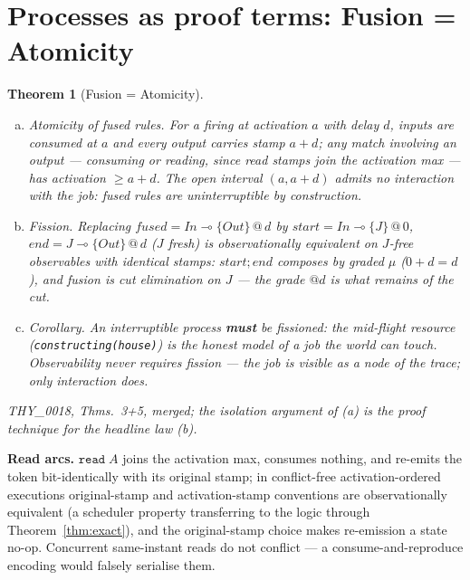 \documentclass[11pt]{article}
\makeatletter
\newcommand{\lax}[2]{\{#1\}\mathbin{@}#2}       %
\newcommand{\loli}{\multimap}                    %
\newtheorem{theorem}{Theorem}[section]
\theoremstyle{definition}
\theoremstyle{remark}
\makeatother
\begin{document}
\section{Processes as proof terms: Fusion = Atomicity}
\label{sec:processes}

\begin{theorem}[Fusion = Atomicity]
\label{thm:fusion}
\begin{enumerate}[(a)]
\item \emph{Atomicity of fused rules.}  For a firing at activation $a$ with
  delay $d$, inputs are consumed at $a$ and every output carries stamp $a+d$;
  any match involving an output --- consuming \emph{or reading}, since read
  stamps join the activation max --- has activation $\geq a+d$.  The open
  interval $(a, a{+}d)$ admits no interaction with the job: fused rules are
  uninterruptible by construction.
\item \emph{Fission.}  Replacing
  $\mathit{fused} = \mathit{In} \loli \lax{\mathit{Out}}{d}$ by
  $\mathit{start} = \mathit{In} \loli \lax{J}{0}$,
  $\mathit{end} = J \loli \lax{\mathit{Out}}{d}$
  ($J$ fresh) is observationally equivalent on $J$-free observables with
  identical stamps: $\mathit{start};\mathit{end}$ composes by graded $\mu$
  ($0+d = d$), and fusion is cut elimination on $J$ --- the grade $@d$ is what
  remains of the cut.
\item \emph{Corollary.}  An interruptible process \textbf{must} be fissioned:
  the mid-flight resource (\texttt{constructing(house)}) is the honest model of
  a job the world can touch.  Observability never requires fission --- the job
  is visible as a node of the trace; only \emph{interaction} does.
\end{enumerate}
THY\_0018, Thms.~3+5, merged; the isolation argument of (a) is the proof
technique for the headline law (b).
\end{theorem}

\medskip
\noindent\textbf{Read arcs.}  $\mathtt{read}\;A$ joins the activation max,
consumes nothing, and re-emits the token bit-identically with its original
stamp; in conflict-free activation-ordered executions original-stamp and
activation-stamp conventions are observationally equivalent (a scheduler
property transferring to the logic through Theorem~\ref{thm:exact}), and the
original-stamp choice makes re-emission a state no-op.  Concurrent same-instant
reads do not conflict --- a consume-and-reproduce encoding would falsely
serialise them.
\end{document}
